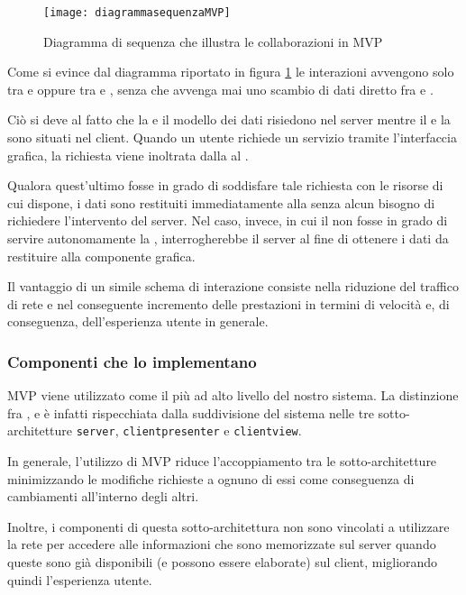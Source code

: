 \begin{figure}[H]
  \centering
  \texttt{[image: diagrammasequenzaMVP]}
  \caption{Diagramma di sequenza che illustra le collaborazioni in MVP}\label{fig:mvpSD}
\end{figure}

Come si evince dal diagramma riportato in figura \ref{fig:mvpSD} le interazioni avvengono solo tra  e  oppure tra  e , senza che avvenga mai uno scambio di dati diretto fra  e .

Ciò si deve al fatto che la  e il modello dei dati risiedono nel server mentre il  e la  sono situati nel client. Quando un utente richiede un servizio tramite l'interfaccia grafica, la richiesta viene inoltrata dalla  al .

Qualora quest'ultimo fosse in grado di soddisfare tale richiesta con le risorse di cui dispone, i dati sono restituiti immediatamente alla  senza alcun bisogno di richiedere l'intervento del server. Nel caso, invece, in cui il  non fosse in grado di servire autonomamente la , interrogherebbe il server al fine di ottenere i dati da restituire alla componente grafica.

Il vantaggio di un simile schema di interazione consiste nella riduzione del traffico di rete e nel conseguente incremento delle prestazioni in termini di velocità e, di conseguenza, dell'esperienza utente in generale.

\subsubsection{Componenti che lo implementano}
MVP viene utilizzato come il  più ad alto livello del nostro sistema. La distinzione fra ,  e  è infatti rispecchiata dalla suddivisione del sistema nelle tre sotto-architetture \texttt{server}, \texttt{clientpresenter} e \texttt{clientview}.

In generale, l'utilizzo di MVP riduce l'accoppiamento tra le sotto-architetture minimizzando le modifiche richieste a ognuno di essi come conseguenza di cambiamenti all'interno degli altri.

Inoltre, i componenti di questa sotto-architettura non sono vincolati a utilizzare la rete per accedere alle informazioni che sono memorizzate sul server quando queste sono già disponibili (e possono essere elaborate) sul client, migliorando quindi l'esperienza utente.

